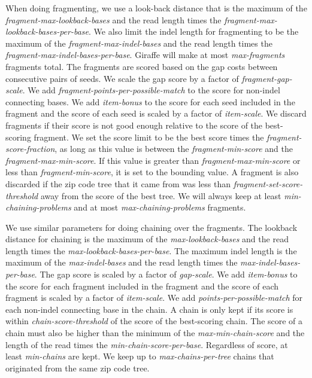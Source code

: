 \documentclass[11pt]{ucscthesis}
\begin{document}
When doing fragmenting, we use a look-back distance that is the maximum of the \emph{fragment-max-lookback-bases} and the read length times the \emph{fragment-max-lookback-bases-per-base}.
We also limit the indel length for fragmenting to be the maximum of the \emph{fragment-max-indel-bases} and the read length times the \emph{fragment-max-indel-bases-per-base}.
Giraffe will make at most \emph{max-fragments} fragments total.
The fragments are scored based on the gap costs between consecutive pairs of seeds.
We scale the gap score by a factor of \emph{fragment-gap-scale}.
We add \emph{fragment-points-per-possible-match} to the score for non-indel connecting bases.
We add \emph{item-bonus} to the score for each seed included in the fragment and the score of each seed is scaled by a factor of \emph{item-scale}.
We discard fragments if their score is not good enough relative to the score of the best-scoring fragment.
We set the score limit to be the best score times the \emph{fragment-score-fraction}, as long as this value is between the \emph{fragment-min-score} and the \emph{fragment-max-min-score}.
If this value is greater than \emph{fragment-max-min-score} or less than \emph{fragment-min-score}, it is set to the bounding value.
A fragment is also discarded if the zip code tree that it came from was less than \emph{fragment-set-score-threshold} away from the score of the best tree.
We will always keep at least \emph{min-chaining-problems} and at most \emph{max-chaining-problems} fragments.

We use similar parameters for doing chaining over the fragments.
The lookback distance for chaining is the maximum of the \emph{max-lookback-bases} and the read length times the \emph{max-lookback-bases-per-base}.
The maximum indel length is the maximum of the \emph{max-indel-bases} and the read length times the \emph{max-indel-bases-per-base}.
The gap score is scaled by a factor of \emph{gap-scale}.
We add \emph{item-bonus} to the score for each fragment included in the fragment and the score of each fragment is scaled by a factor of \emph{item-scale}.
We add \emph{points-per-possible-match} for each non-indel connecting base in the chain.
A chain is only kept if its score is within \emph{chain-score-threshold} of the score of the best-scoring chain.
The score of a chain must also be higher than the minimum of the \emph{max-min-chain-score} and the length of the read times the \emph{min-chain-score-per-base}.
Regardless of score, at least \emph{min-chains} are kept.
We keep up to \emph{max-chains-per-tree} chains that originated from the same zip code tree.
\end{document}
